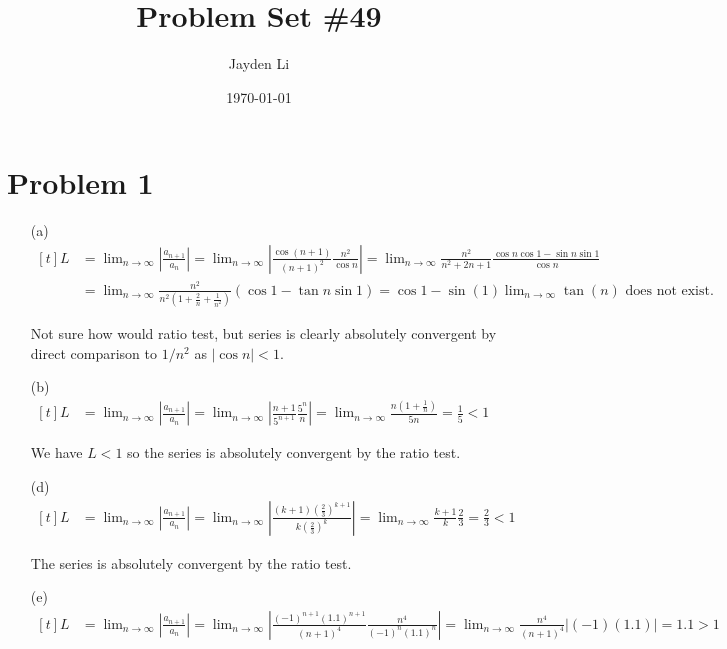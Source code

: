 \documentclass[preview, margin=0.6in]{standalone}
\title{\vspace*{-40pt}Problem Set \#49}
\author{Jayden Li}
\date{\today}
\newcommand*{\problem}[1]{\section*{Problem #1}}
\begin{document}
\fontsize{12pt}{12pt}\selectfont
\setlength{\abovedisplayskip}{\abovedisplayskip/2}
\setlength{\belowdisplayskip}{\belowdisplayskip/2}
\setlength{\parindent}{0pt}
\setlength{\parskip}{2ex plus 0.5ex minus 0.2ex}
\maketitle

\problem{1}
\begin{itemize}
\item[(a)]
	$\begin{aligned}[t]
		L
		&=\lim_{n\to\infty}\left|\frac{a_{n+1}}{a_n}\right|
		=\lim_{n\to\infty}\left|\frac{\cos(n+1)}{(n+1)^2}\frac{n^2}{\cos n}\right|
		=\lim_{n\to\infty}\frac{n^2}{n^2+2n+1}\frac{\cos n\cos 1-\sin n \sin 1}{\cos n} \\
		&=\lim_{n\to\infty}\frac{n^2}{n^2 \left(1+\frac 2n+\frac{1}{n^2}\right)}\left(\cos1-\tan n\sin 1\right)
		=\cos 1-\sin(1)\lim_{n\to\infty}\tan(n)
		\text{ does not exist.}
	\end{aligned}$

	Not sure how would ratio test, but series is clearly absolutely convergent by direct comparison to $1/n^2$ as $\left|\cos n\right|<1$.

\item[(b)]
	$\begin{aligned}[t]
		L 
		&=\lim_{n\to\infty}\left|\frac{a_{n+1}}{a_n}\right|
		=\lim_{n\to\infty}\left|\frac{n+1}{5^{n+1}}\frac{5^n}{n}\right|
		=\lim_{n\to\infty}\frac{n \left(1+\frac1n\right)}{5n}
		=\frac15<1
	\end{aligned}$

	We have $L<1$ so the series is absolutely convergent by the ratio test.

\item[(d)]
	$\begin{aligned}[t]
		L
		&=\lim_{n\to\infty}\left|\frac{a_{n+1}}{a_n}\right|
		=\lim_{n\to\infty}\left|\frac{(k+1)\left(\frac23\right)^{k+1}}{k \left(\frac23\right)^k}\right|
		=\lim_{n\to\infty}\frac{k+1}{k}\frac23
		=\frac23<1
	\end{aligned}$

	The series is absolutely convergent by the ratio test.

\item[(e)]
	$\begin{aligned}[t]
		L
		&=\lim_{n\to\infty}\left|\frac{a_{n+1}}{a_n}\right|
		=\lim_{n\to\infty}\left|\frac{(-1)^{n+1}(1.1)^{n+1}}{(n+1)^4}\frac{n^4}{(-1)^n(1.1)^n}\right|
		=\lim_{n\to\infty}\frac{n^4}{(n+1)^4}\left|(-1)(1.1)\right|
		=1.1>1
	\end{aligned}$


\end{itemize}
\end{document}
